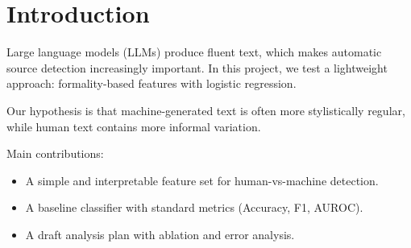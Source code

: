 \section{Introduction}

Large language models (LLMs) produce fluent text, which makes automatic source
detection increasingly important. In this project, we test a lightweight
approach: formality-based features with logistic regression.

Our hypothesis is that machine-generated text is often more stylistically
regular, while human text contains more informal variation.

Main contributions:
\begin{itemize}
  \item A simple and interpretable feature set for human-vs-machine detection.
  \item A baseline classifier with standard metrics (Accuracy, F1, AUROC).
  \item A draft analysis plan with ablation and error analysis.
\end{itemize}
